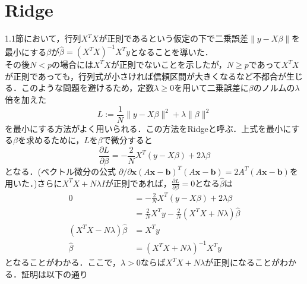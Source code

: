 \documentclass{jsarticle}
\theoremstyle{definition}
\theoremstyle{mystyle} %
\begin{document}
\section*{Ridge}
1.1節において，行列$X^TX$が正則であるという仮定の下で二乗誤差$\|y-X\beta\|$を最小にする$\beta$が$\hat{\beta}=(X^TX)^{-1}X^T y$となることを導いた．\\
その後$N<p$の場合には$X^T X$が正則でないことを示したが，$N\geq p$であって$X^T X$が正則であっても，行列式が小さければ信頼区間が大きくなるなど不都合が生じる．このような問題を避けるため，定数$\lambda\geq 0$を用いて二乗誤差に$\beta$のノルムの$\lambda$倍を加えた
$$L:=\frac{1}{N}\|y-X\beta\|^2+\lambda\|\beta\|^2$$
を最小にする方法がよく用いられる．この方法をRidgeと呼ぶ．上式を最小にする$\beta$を求めるために，$L$を$\beta$で微分すると
$$\frac{\partial L}{\partial \beta}=-\frac{2}{N}X^T(y-X\beta)+2\lambda\beta$$
となる．(ベクトル微分の公式 $\partial/\partial {\bm x}(A{\bm x}-{\bm b})^T(A{\bm x}-{\bm b})=2A^T(A{\bm x}-{\bm b})$を用いた．)さらに$X^TX+N\lambda I$が正則であれば，$\frac{\partial L}{\partial \beta}=0$となる$\hat{\beta}$は
\begin{align*}
0 &=-\frac{2}{N}X^T(y-X\beta)+2\lambda\beta\\
&=\frac{2}{N}X^T y-\frac{2}{N}(X^TX+ N\lambda)\hat{\beta}\\
(X^TX - N\lambda)\hat{\beta}&= X^T y\\
\hat{\beta} &=(X^TX +N\lambda)^{-1}X^Ty
\end{align*}
となることがわかる．ここで，$\lambda>0$ならば$X^TX+ N \lambda$が正則になることがわかる．証明は以下の通り
\end{document}
